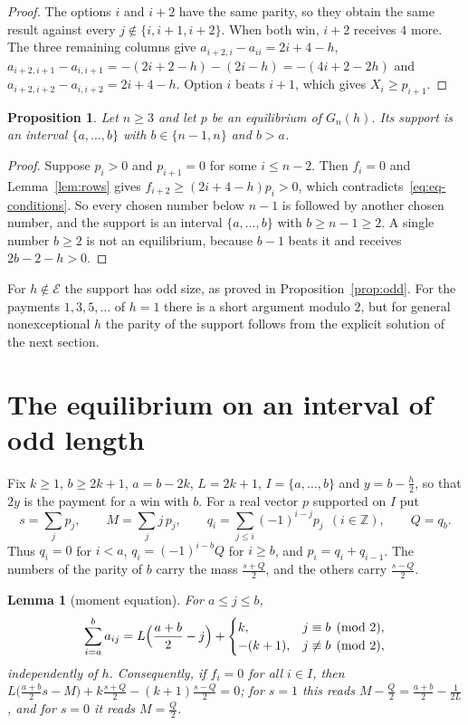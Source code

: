 \documentclass[11pt]{article}
\newtheorem{lemma}[theorem]{Lemma}
\newtheorem{proposition}[theorem]{Proposition}
\theoremstyle{definition}
\theoremstyle{remark}
\begin{document}
\begin{proof}
The options $i$ and $i+2$ have the same parity, so they obtain the same
result against every $j\notin\{i,i+1,i+2\}$. When both win, $i+2$
receives $4$ more. The three remaining columns give
$a_{i+2,i}-a_{ii}=2i+4-h$,
$a_{i+2,i+1}-a_{i,i+1}=-(2i+2-h)-(2i-h)=-(4i+2-2h)$ and
$a_{i+2,i+2}-a_{i,i+2}=2i+4-h$. Option $i$ beats $i+1$, which gives
$X_i\ge p_{i+1}$.
\end{proof}

\begin{proposition}\label{prop:support}
Let $n\ge3$ and let $p$ be an equilibrium of $G_n(h)$. Its support is an
interval $\{a,\dots,b\}$ with $b\in\{n-1,n\}$ and $b>a$.
\end{proposition}

\begin{proof}
Suppose $p_i>0$ and $p_{i+1}=0$ for some $i\le n-2$. Then $f_i=0$ and
Lemma~\ref{lem:rows} gives $f_{i+2}\ge(2i+4-h)p_i>0$, which
contradicts~\eqref{eq:eq-conditions}. So every chosen number below $n-1$
is followed by another chosen number, and the support is an interval
$\{a,\dots,b\}$ with $b\ge n-1\ge2$. A single number $b\ge2$ is not an
equilibrium, because $b-1$ beats it and receives $2b-2-h>0$.
\end{proof}

For $h\notin\mathcal E$ the support has odd size, as proved in
Proposition~\ref{prop:odd}.
For the payments $1,3,5,\dots$ of $h=1$ there is a short argument modulo
$2$, but for general nonexceptional $h$ the parity of the support follows
from the explicit solution of the next section.

\section{The equilibrium on an interval of odd length}\label{sec:interval}

Fix $k\ge1$, $b\ge2k+1$, $a=b-2k$, $L=2k+1$, $I=\{a,\dots,b\}$ and
$y=b-\frac h2$, so that $2y$ is the payment for a win with $b$. For a
real vector $p$ supported on $I$ put
\[
s=\sum_jp_j,\qquad M=\sum_jj\,p_j,\qquad q_i=\sum_{j\le i}(-1)^{i-j}p_j\
\ (i\in\mathbb Z),\qquad Q=q_b .
\]
Thus $q_i=0$ for $i<a$, $q_i=(-1)^{i-b}Q$ for $i\ge b$, and
$p_i=q_i+q_{i-1}$. The numbers of the parity of $b$ carry the mass
$\frac{s+Q}2$, and the others carry $\frac{s-Q}2$.

\begin{lemma}[moment equation]\label{lem:moment}
For $a\le j\le b$,
\[
\sum_{i=a}^{b}a_{ij}=L\Bigl(\frac{a+b}2-j\Bigr)+
\begin{cases}k,&j\equiv b\pmod2,\\-(k+1),&j\not\equiv b\pmod 2,\end{cases}
\]
independently of $h$. Consequently, if $f_i=0$ for all $i\in I$, then
$L\bigl(\frac{a+b}2s-M\bigr)+k\frac{s+Q}2-(k+1)\frac{s-Q}2=0$; for $s=1$
this reads $M-\frac Q2=\frac{a+b}2-\frac1{2L}$, and for $s=0$ it reads
$M=\frac Q2$.
\end{lemma}
\end{document}

